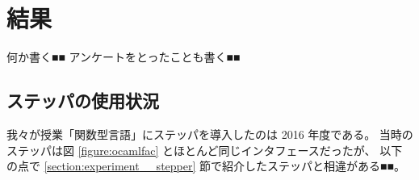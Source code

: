 \section{結果}
\label{section:experiment__result}

何か書く■■
アンケートをとったことも書く■■

\subsection{ステッパの使用状況}
\label{subsection:result__uses}

我々が授業「関数型言語」にステッパを導入したのは 2016 年度である。
当時のステッパは図 \ref{figure:ocamlfac} とほとんど同じインタフェースだったが、
以下の点で \ref{section:experiment__stepper} 節で紹介したステッパと相違がある■■。
